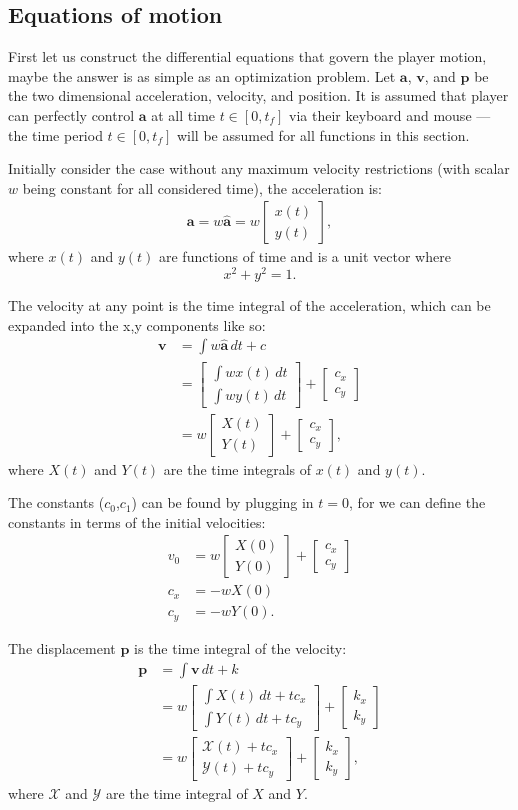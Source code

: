 \documentclass[a4paper,11pt]{article}
\newcommand{\tvec}[1]{\boldsymbol{#1}}
\newcommand{\tunit}[1]{\boldsymbol{\hat{#1}}}
\newcommand{\ta}{\tvec{a}}
\newcommand{\tv}{\tvec{v}}
\newcommand{\tp}{\tvec{p}}
\newcommand{\tpar}[2]{\begin{bmatrix}#1\\#2 \end{bmatrix}}
\newcommand{\tfx}{\mathcal{X}}
\newcommand{\tfy}{\mathcal{Y}}
\begin{document}
\subsection{Equations of motion}
First let us construct the differential equations that govern the player motion, maybe the answer is as simple as an optimization problem. Let $\ta$, $\tv$, and $\tp$ be the two dimensional acceleration, velocity, and position. It is assumed that player can perfectly control $\ta$ at all time $t \in [0, t_f]$ via their keyboard and mouse --- the time period $t\in[0,t_f]$ will be assumed for all functions in this section.

Initially consider the case without any maximum velocity restrictions (with scalar $w$ being constant for all considered time), the acceleration is:
\begin{align*}
 \ta = w\tunit{a} = w\tpar{x(t)}{y(t)},
\end{align*}
where $x(t)$ and $y(t)$ are functions of time and is a unit vector where
\[
    x^2 + y^2 = 1.
\]

The velocity at any point is the time integral of the acceleration, which can be expanded into the x,y components like so:
\begin{align*}
    \tv &= \int w\tunit{a} \,dt + c\\
    &= \tpar{\int w x(t) \,dt}{ \int w y(t) \,dt} + \tpar{c_x}{c_y}\\
    &= w\tpar{X(t)}{Y(t)} + \tpar{c_x}{c_y},
\end{align*}
where $X(t)$ and $Y(t)$ are the time integrals of $x(t)$ and $y(t)$.

The constants ($c_0$,$c_1$) can be found by plugging in $t=0$, for we can define the constants in terms of the initial velocities:
\begin{align*}
    v_0 &= w \tpar{X(0)}{Y(0)} + \tpar{c_x}{c_y}\\
    c_x &= -wX(0)\\
    c_y &= -wY(0).
\end{align*}

The displacement $\tp$ is the time integral of the velocity:
\begin{align*}
    \tp &= \int \tv \, dt + k\\
    &= w \tpar{\int X(t) \, dt + tc_x}{\int Y(t) \, dt + tc_y} + \tpar{k_x}{k_y}\\
    &= w \tpar {\tfx(t) + tc_x}{\tfy(t) + tc_y} + \tpar{k_x}{k_y},
\end{align*}
where $\tfx$ and $\tfy$ are the time integral of $X$ and $Y$.
\end{document}

